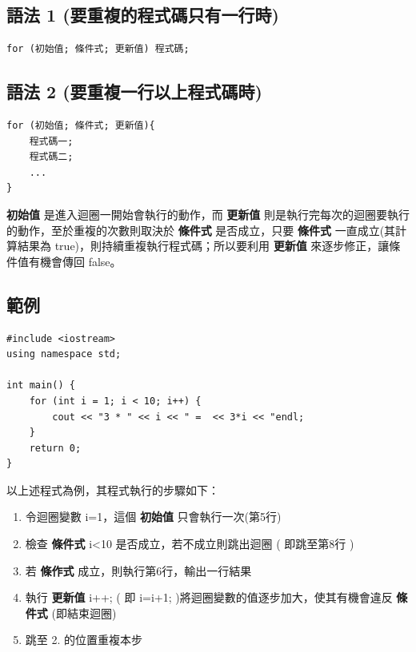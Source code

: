 \documentclass[a4paper,12pt]{article}
\begin{document}
\subsection{語法 1 (要重複的程式碼只有一行時)}
\label{sec:org89bb8a1}
\lstset{breaklines=true,language=cpp,label= ,caption= ,captionpos=b,firstnumber=1,numbers=left}
\begin{lstlisting}
for (初始值; 條件式; 更新值) 程式碼;
\end{lstlisting}

\subsection{語法 2 (要重複一行以上程式碼時)}
\label{sec:org029ae4a}
\lstset{breaklines=true,language=cpp,label= ,caption= ,captionpos=b,firstnumber=1,numbers=left}
\begin{lstlisting}
for (初始值; 條件式; 更新值){
    程式碼一;
    程式碼二;
    ...
}
\end{lstlisting}

\textbf{初始值} 是進入迴圈一開始會執行的動作，而 \textbf{更新值} 則是執行完每次的迴圈要執行的動作，至於重複的次數則取決於 \textbf{條件式} 是否成立，只要 \textbf{條件式} 一直成立(其計算結果為 true)，則持續重複執行程式碼；所以要利用 \textbf{更新值} 來逐步修正，讓條件值有機會傳回 false。\\

\subsection{範例}
\label{sec:orgba33329}
\lstset{breaklines=true,language=cpp,label= ,caption= ,captionpos=b,firstnumber=1,numbers=left}
\begin{lstlisting}
#include <iostream>
using namespace std;

int main() {
    for (int i = 1; i < 10; i++) {
        cout << "3 * " << i << " =  << 3*i << "endl;
    }
    return 0;
}
\end{lstlisting}

以上述程式為例，其程式執行的步驟如下：\\
\begin{enumerate}
\item 令迴圈變數 i=1，這個 \textbf{初始值} 只會執行一次(第5行)\\
\item 檢查 \textbf{條件式} i<10 是否成立，若不成立則跳出迴圈 ( 即跳至第8行 )\\
\item 若 \textbf{條作式} 成立，則執行第6行，輸出一行結果\\
\item 執行 \textbf{更新值} i++; ( 即 i=i+1; )將迴圈變數的值逐步加大，使其有機會違反 \textbf{條件式} (即結束迴圈)\\
\item 跳至 2. 的位置重複本步\\
\end{enumerate}
\end{document}
